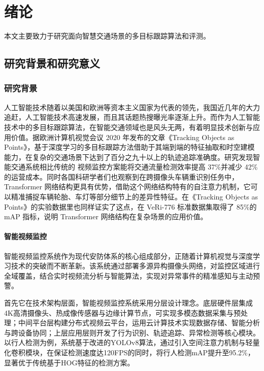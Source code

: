 \chapter{绪论}

本文主要致力于研究面向智慧交通场景的多目标跟踪算法和评测。

\section{研究背景和研究意义}

\subsection{研究背景}

人工智能技术随着以美国和欧洲等资本主义国家为代表的领先，我国近几年的大力追赶，人工智能技术高速发展，而且其话题热搜曝光率逐渐上升。而作为人工智能技术中的多目标跟踪算法，在智能交通领域也是风头无两，有着明显技术创新与应用价值。据欧洲计算机视觉会议 2020 年发布的文章《Tracking Objects as Points》，基于深度学习的多目标跟踪方法借助于其端到端的特征抽取和时空建模能力，在复杂的交通场景下达到了百分之九十以上的轨迹追踪准确度\cite{zhou2020tracking}。研究发现智能交通系统相比传统的 视频监控方案能将交通流量检测效率提高 37\%并减少 42\%的运营成本\cite{wang2023cost}。同时各国科研学者们也观察到在跨摄像头车辆重识别任务中，Transformer 网络结构更具有优势，借助这个网络结构特有的自注意力机制，它可以精准捕捉车辆轮胎、车灯等部分细节上的差异性特征。在《Tracking Objects as Points》的实验数据里也同样证实了这点，在 VeRi-776 标准数据集取得了 85\%的 mAP 指标\cite{chen2022vehicle}，说明 Transformer 网络结构在复杂场景的应用价值。

\subsubsection{智能视频监控}


智能视频监控系统作为现代安防体系的核心组成部分，正随着计算机视觉与深度学习技术的突破而不断革新。该系统通过部署多源异构摄像头网络，对监控区域进行全域覆盖，结合实时视频流分析与智能算法，实现对异常事件的精准感知与主动预警。

首先它在技术架构层面，智能视频监控系统采用分层设计理念。底层硬件层集成4K高清摄像头、热成像传感器与边缘计算节点，可实现多模态数据采集与预处理；中间平台层构建分布式视频云平台，运用云计算技术实现数据存储、智能分析与跨设备协同；上层应用层则开发了行为识别、轨迹追踪、异常检测等核心模块。以行人检测为例，系统基于改进的YOLOv8算法，通过引入空间注意力机制与轻量化卷积模块，在保证检测速度达120FPS的同时，将行人检测mAP提升至95.2\%，显著优于传统基于HOG特征的检测方案。

